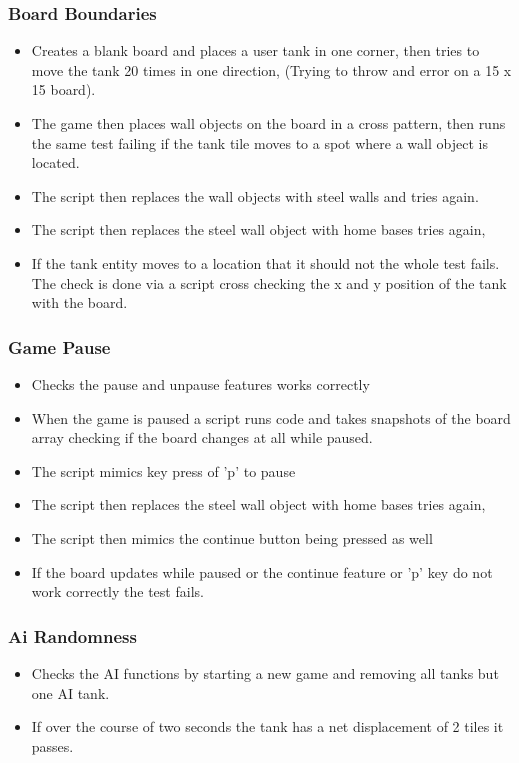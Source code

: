 \documentclass{article}
\begin{document}
\subsubsection{Board Boundaries}
\begin{itemize}  
\item Creates a blank board and places a user tank in one corner, then tries to move the
	tank 20 times in one direction, (Trying to throw and error on a 15 x 15 board).
\item The game then places wall objects on the board in a cross pattern, then runs the same 
	test failing if the tank tile moves to a spot where a wall object is located.  
\item The script then replaces the wall objects with steel walls and tries again.
\item The script then replaces the steel wall object with home bases tries again,
\item If the tank entity moves to  a location that it should not the whole test fails. 
	The check is done via a script cross checking the x and y position of the tank with
	the board.
\end{itemize}

\subsubsection{Game Pause}
\begin{itemize}  
\item Checks the pause and unpause features works correctly
\item When the game is paused a script runs code and takes snapshots of the board array
	checking if the board changes at all while paused. 
\item The script mimics key press of 'p' to pause 
\item The script then replaces the steel wall object with home bases tries again,
\item The script then mimics the continue button being pressed as well
\item If the board updates while paused or the continue feature or 'p' key
	do not work correctly the test fails.
\end{itemize}

\subsubsection{Ai Randomness}
\begin{itemize}  
\item Checks the AI functions by starting a new game and removing all tanks
	but one AI tank.
\item If over the course of two seconds the tank has a net displacement of 2 tiles
	it passes.
\end{itemize}
\end{document}
